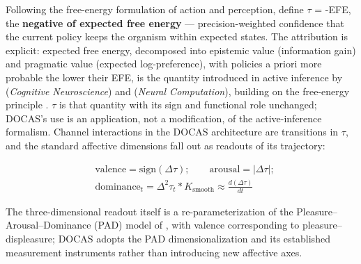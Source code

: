\documentclass[
]{article}
\begin{document}
Following the free-energy formulation of action and perception, define
\(\tau\) = -EFE, the \textbf{negative of expected free energy} ---
precision-weighted confidence that the current policy keeps the organism
within expected states. The attribution is explicit: expected free
energy, decomposed into epistemic value (information gain) and pragmatic
value (expected log-preference), with policies a priori more probable
the lower their EFE, is the quantity introduced in active inference by
(\emph{Cognitive Neuroscience}) and (\emph{Neural Computation}),
building on the free-energy principle . \(\tau\) is that quantity with
its sign and functional role unchanged; DOCAS's use is an application,
not a modification, of the active-inference formalism. Channel
interactions in the DOCAS architecture are transitions in \(\tau\), and
the standard affective dimensions fall out as readouts of its
trajectory:

\begin{equation}
\begin{split}
&\mathrm{valence} = \mathrm{sign}(\Delta\tau); \qquad \mathrm{arousal} = |\Delta\tau|;\\
&\mathrm{dominance}_t = \Delta^2\tau_t * K_{\mathrm{smooth}} \approx \frac{d(\Delta\tau)}{dt}
\end{split}
\tag{1}\label{eq:readout}
\end{equation}

The three-dimensional readout itself is a re-parameterization of the
Pleasure--Arousal--Dominance (PAD) model of , with valence corresponding
to pleasure--displeasure; DOCAS adopts the PAD dimensionalization and
its established measurement instruments rather than introducing new
affective axes.
\end{document}
